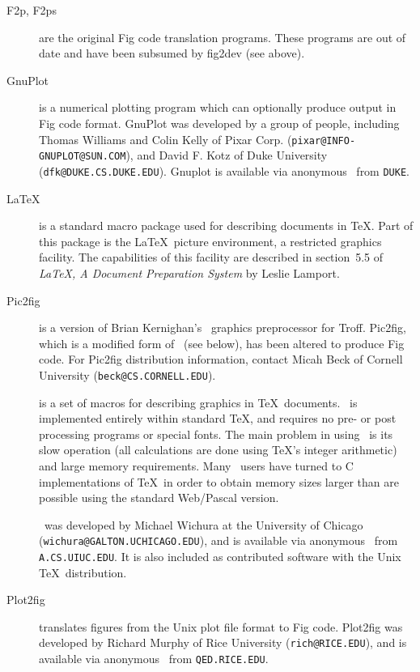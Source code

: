 \begin{description}
\item[F2p, F2ps]
	are the original Fig code translation programs.
These programs are out of date and have been subsumed by fig2dev (see above).

\item[GnuPlot]
	is a numerical plotting program which can optionally produce output
	in Fig code format.
GnuPlot was developed by a group of people, including
	Thomas Williams and Colin Kelly of Pixar Corp.
	({\tt pixar@INFO-GNUPLOT@SUN.COM}),
	and David F. Kotz of Duke University ({\tt dfk@DUKE.CS.DUKE.EDU}).
Gnuplot is available via anonymous \FTP\ from {\tt DUKE}.

\item[\LaTeX]
	is a standard macro package used for describing documents in \TeX.
Part of this package is the \LaTeX\ picture environment, a restricted
	graphics facility.
The capabilities of this facility are described in section~5.5 of 
	{\em \LaTeX, A Document Preparation System} by Leslie Lamport.

\item[Pic2fig]
	is a version of Brian Kernighan's \PIC\ graphics preprocessor
	for Troff.
Pic2fig, which is a modified form of \tpic\ (see below), has been altered
	to produce Fig code.
For Pic2fig distribution information, contact Micah Beck of
	Cornell University ({\tt beck@CS.CORNELL.EDU}).

	
\item[\PicTeX]
	is a set of macros for describing graphics in \TeX\ documents.
	\PicTeX\ is implemented entirely within standard \TeX, and requires no
	pre- or post processing programs or special fonts.
The main problem in using \PicTeX\ is its slow operation (all calculations
	are done using \TeX's integer arithmetic) and large memory
	requirements.
Many \PicTeX\ users have turned to C implementations of \TeX\ in order
	to obtain memory sizes larger than are possible using the standard
	Web/Pascal version.

\PicTeX\ was developed by Michael Wichura at the University of
	Chicago ({\tt wichura@GALTON.UCHICAGO.EDU}), and is available via
	anonymous \FTP\  from {\tt A.CS.UIUC.EDU}.
It is also included as contributed software with the Unix \TeX\ distribution.

\item [Plot2fig]
	translates figures from the Unix plot file format to Fig code.
Plot2fig was developed by Richard Murphy of Rice University
	({\tt rich@RICE.EDU}),
	and is available via anonymous \FTP\ from {\tt QED.RICE.EDU}.


\end{description}

